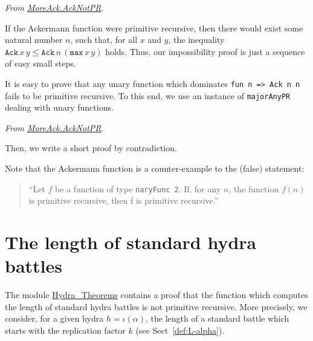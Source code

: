 \vspace{4pt}
\noindent
\emph{From \href{../theories/html/hydras.MoreAck.AckNotPR.html}{MoreAck.AckNotPR}.}






If the Ackermann function were primitive recursive, then there would exist some natural number $n$, such that, for all $x$ and $y$, the inequality 
$\texttt{Ack}\,x\,y\leq \texttt{Ack}\,n\,(\texttt{max}\,x\,y)$ holds.
Thus, our impossibility proof is just a sequence of easy small steps.



\begin{remark}
It is easy to prove that any unary function which dominates \texttt{fun n => Ack n n} fails to be primitive recursive. To this end, we use an instance of \texttt{majorAnyPR} dealing with unary functions.

\vspace{4pt}
\noindent

\emph{From \href{../theories/html/hydras.MoreAck.AckNotPR.html}{MoreAck.AckNotPR}}.



Then, we write  a short proof by contradiction.



\end{remark}

\begin{remark}
Note that the Ackermann function is a counter-example to the (false) statement:
\begin{quote}
{\color{red}
  ``Let $f$ be a function of type \texttt{naryFunc\,2}. If, for any $n$, the function $f(n)$ is primitive recursive, then f is primitive recursive.''}
\end{quote}
\end{remark}


\section{The length of standard hydra battles}
\label{sect:battle-length-notPR}

The module \href{../theories/html/hydras.Hydra.Hydra_Theorems.html}{Hydra\_Theorems} contains a proof that the function which computes the length of standard hydra battles is not primitive recursive. More precisely, we consider, for a given hydra $h=\iota(\alpha)$, the length of a standard battle which starts with the replication factor $k$ (see Sect~\vref{def:L-alpha}).

